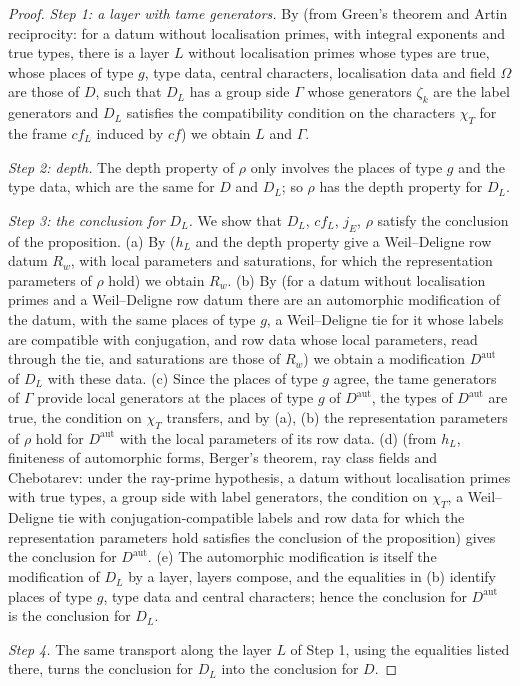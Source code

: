 \begin{proof}
\emph{Step 1: a layer with tame generators.} By
 (from Green's theorem and Artin
reciprocity: for a datum without localisation primes, with integral exponents and true types, there is a
layer $L$ without localisation primes whose types are true, whose places of type $g$, type data, central
characters, localisation data and field $\Omega$ are those of $D$, such that $D_L$ has a group side $\Gamma$ whose
generators $\zeta_k$ are the label generators and $D_L$ satisfies the compatibility condition on the characters
$\chi_T$ for the frame $cf_L$ induced by $cf$) we obtain $L$ and $\Gamma$.

\emph{Step 2: depth.} The depth property of $\rho$ only involves the places of type $g$ and the type data,
which are the same for $D$ and $D_L$; so $\rho$ has the depth property for $D_L$.

\emph{Step 3: the conclusion for $D_L$.} We show that $D_L$, $cf_L$, $j_E$, $\rho$ satisfy the conclusion of
the proposition. (a) By  ($h_L$ and the depth
property give a Weil--Deligne row datum $R_w$, with local parameters and saturations, for which the
representation parameters of $\rho$ hold) we obtain $R_w$. (b) By
 (for a datum without localisation primes
and a Weil--Deligne row datum there are an automorphic modification of the datum, with the same places of
type $g$, a Weil--Deligne tie for it whose labels are compatible with conjugation, and row data whose local
parameters, read through the tie, and saturations are those of $R_w$) we obtain a modification $D^{\mathrm{aut}}$
of $D_L$ with these data. (c) Since the places of type $g$ agree, the tame generators of $\Gamma$ provide local
generators at the places of type $g$ of $D^{\mathrm{aut}}$, the types of $D^{\mathrm{aut}}$ are true, the condition on
$\chi_T$ transfers, and by (a), (b) the representation parameters of $\rho$ hold for $D^{\mathrm{aut}}$ with the
local parameters of its row data. (d)
 (from $h_L$, finiteness of
automorphic forms, Berger's theorem, ray class fields and Chebotarev: under the ray-prime hypothesis, a
datum without localisation primes with true types, a group side with label generators, the condition on
$\chi_T$, a Weil--Deligne tie with conjugation-compatible labels and row data for which the representation
parameters hold satisfies the conclusion of the proposition) gives the conclusion for $D^{\mathrm{aut}}$. (e) The
automorphic modification is itself the modification of $D_L$ by a layer, layers compose, and the equalities
in (b) identify places of type $g$, type data and central characters; hence the conclusion for $D^{\mathrm{aut}}$ is
the conclusion for $D_L$.

\emph{Step 4.} The same transport along the layer $L$ of Step 1, using the equalities listed there, turns
the conclusion for $D_L$ into the conclusion for $D$.
\end{proof}

